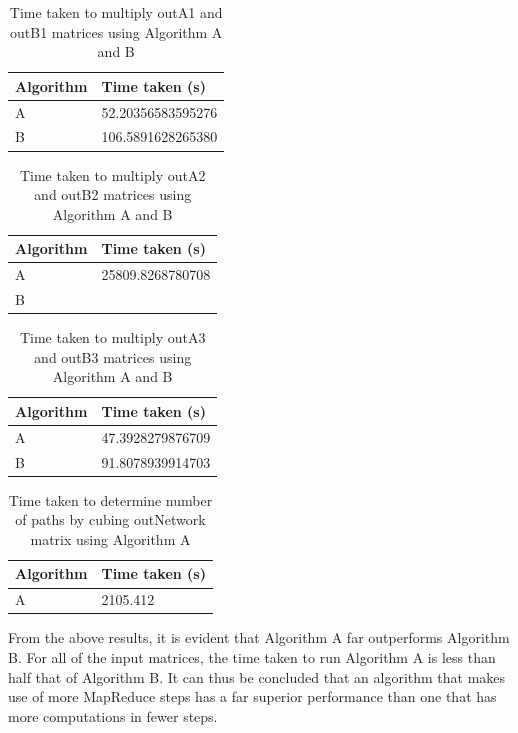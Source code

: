 \documentclass[10pt,twocolumn]{witseiepaper}
\begin{document}
\begin{table}[h]
		\centering
		\caption{Time taken to multiply outA1 and outB1 matrices using Algorithm A and B}
\begin{tabular}{|l|l|}
	\hline 
	\textbf{Algorithm} & \textbf{Time taken (s)} \\ 
	\hline 
	 A & 52.20356583595276 \\ 
	\hline 
	 B & 106.5891628265380 \\ 
	\hline 
\end{tabular} 
\end{table}

\begin{table}[h]
	\centering
	\caption{Time taken to multiply outA2 and outB2 matrices using Algorithm A and B}
	\begin{tabular}{|l|l|}
		\hline 
		\textbf{Algorithm} & \textbf{Time taken (s)} \\ 
		\hline 
		A & 25809.8268780708 \\ 
		\hline 
		B &  \\ 
		\hline 
	\end{tabular} 
\end{table}

\begin{table}[h]
	\centering
	\caption{Time taken to multiply outA3 and outB3 matrices using Algorithm A and B}
	\begin{tabular}{|l|l|}
		\hline 
		\textbf{Algorithm} & \textbf{Time taken (s)} \\ 
		\hline 
		A & 47.3928279876709 \\ 
		\hline 
		B & 91.8078939914703 \\ 
		\hline 
	\end{tabular} 
\end{table}

\begin{table}[h]
	\centering
	\caption{Time taken to determine number of paths by cubing outNetwork matrix using Algorithm A}
	\begin{tabular}{|l|l|}
		\hline 
		\textbf{Algorithm} & \textbf{Time taken (s)} \\ 
		\hline 
		A & 2105.412 \\ 
		\hline 
	\end{tabular} 
\end{table}

From the above results, it is evident that Algorithm A far outperforms Algorithm B. For all of the input matrices, the time taken to run Algorithm A is less than half that of Algorithm B. It can thus be concluded that an algorithm that makes use of more MapReduce steps has a far superior performance than one that has more computations in fewer steps. 



\end{document}

